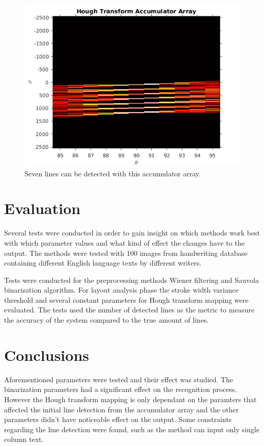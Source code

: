 \documentclass{article}
\begin{document}
\begin{multicols}{2}
        \begin{figure}[H]
          \centering
          \includegraphics[natwidth=560,natheight=420,scale=0.3]{hough_accArr_a01-000u.png}
          \caption{Seven lines can be detected with this accumulator array.\label{fig:houghacc2}}
        \end{figure}

        \section*{Evaluation}
          Several tests were conducted in order to gain insight on which methods work best with which parameter values and what kind of effect the changes have to the output. The methods were tested with 100 images from handwriting database containing different English language texts by different writers.

          Tests were conducted for the preprocessing methods Wiener filtering and Sauvola binarization algorithm. For layout analysis phase the stroke width variance threshold and several constant parameters for Hough transform mapping were evaluated. The tests used the number of detected lines as the metric to measure the accuracy of the system compared to the true amount of lines.

        \section*{Conclusions}
          Aforementioned parameters were tested and their effect was studied. The binarization parameters had a significant effect on the recognition process. However the Hough transform mapping is only dependant on the paramters that affected the initial line detection from the accumulator array and the other parameters didn't have noticeable effect on the output. Some constraints regarding the line detection were found, such as the method can input only single column text.


\end{multicols}
\end{document}

